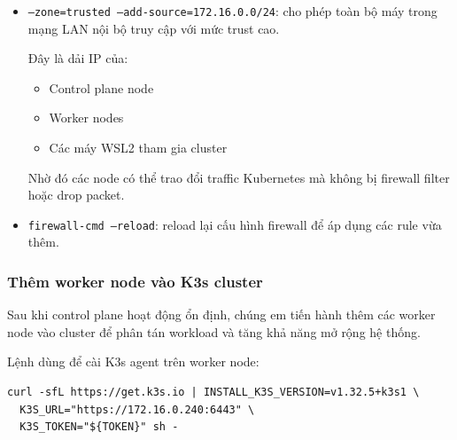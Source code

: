 \begin{itemize}
    Dải mạng này chứa các ClusterIP service của Kubernetes. Rule này giúp:
    
    \begin{itemize}
        \item Các node và pod có thể truy cập Kubernetes Service thông qua ClusterIP.
        \item DNS nội bộ và service discovery hoạt động chính xác.
    \end{itemize}
    
    \item \texttt{--zone=trusted --add-source=172.16.0.0/24}: cho phép toàn bộ máy trong mạng LAN nội bộ truy cập với mức trust cao.
    
    Đây là dải IP của:
    
    \begin{itemize}
        \item Control plane node
        \item Worker nodes
        \item Các máy WSL2 tham gia cluster
    \end{itemize}
    
    Nhờ đó các node có thể trao đổi traffic Kubernetes mà không bị firewall filter hoặc drop packet.
    
    \item \texttt{firewall-cmd --reload}: reload lại cấu hình firewall để áp dụng các rule vừa thêm.
\end{itemize}

\subsubsection{Thêm worker node vào K3s cluster}

Sau khi control plane hoạt động ổn định, chúng em tiến hành thêm các worker node vào cluster để phân tán workload và tăng khả năng mở rộng hệ thống.

Lệnh dùng để cài K3s agent trên worker node:

\begin{verbatim}
curl -sfL https://get.k3s.io | INSTALL_K3S_VERSION=v1.32.5+k3s1 \
  K3S_URL="https://172.16.0.240:6443" \
  K3S_TOKEN="${TOKEN}" sh -
\end{verbatim}

